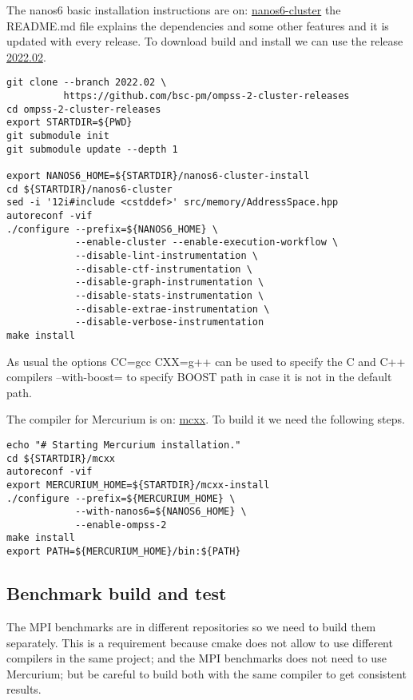 \documentclass{article}
\begin{document}
The nanos6 basic installation instructions are on:
\href{https://github.com/bsc-pm/nanos6-cluster}{nanos6-cluster} the
README.md file explains the dependencies and some other features and
it is updated with every release. To download build and install we can
use the release
\href{https://github.com/bsc-pm/ompss-2-cluster-releases}{2022.02}.

\begin{lstlisting}
git clone --branch 2022.02 \
          https://github.com/bsc-pm/ompss-2-cluster-releases
cd ompss-2-cluster-releases
export STARTDIR=${PWD}
git submodule init
git submodule update --depth 1

export NANOS6_HOME=${STARTDIR}/nanos6-cluster-install
cd ${STARTDIR}/nanos6-cluster
sed -i '12i#include <cstddef>' src/memory/AddressSpace.hpp
autoreconf -vif
./configure --prefix=${NANOS6_HOME} \
            --enable-cluster --enable-execution-workflow \
            --disable-lint-instrumentation \
            --disable-ctf-instrumentation \
            --disable-graph-instrumentation \
            --disable-stats-instrumentation \
            --disable-extrae-instrumentation \
            --disable-verbose-instrumentation
make install
\end{lstlisting}

As usual the options CC=gcc CXX=g++ can be used to specify the C and
C++ compilers --with-boost= to specify BOOST path in case it is not in
the default path.

The compiler for Mercurium is on:
\href{https://github.com/bsc-pm/mcxx}{mcxx}. To build it we need the
following steps.

\begin{lstlisting}
echo "# Starting Mercurium installation."
cd ${STARTDIR}/mcxx
autoreconf -vif
export MERCURIUM_HOME=${STARTDIR}/mcxx-install
./configure --prefix=${MERCURIUM_HOME} \
            --with-nanos6=${NANOS6_HOME} \
            --enable-ompss-2
make install
export PATH=${MERCURIUM_HOME}/bin:${PATH}
\end{lstlisting}

\subsection{Benchmark build and test}\label{manualbench}

The MPI benchmarks are in different repositories so we need to build
them separately. This is a requirement because cmake does not allow to use
different compilers in the same project; and the MPI benchmarks does
not need to use Mercurium; but be careful to build both with the same
compiler to get consistent results.
\end{document}
